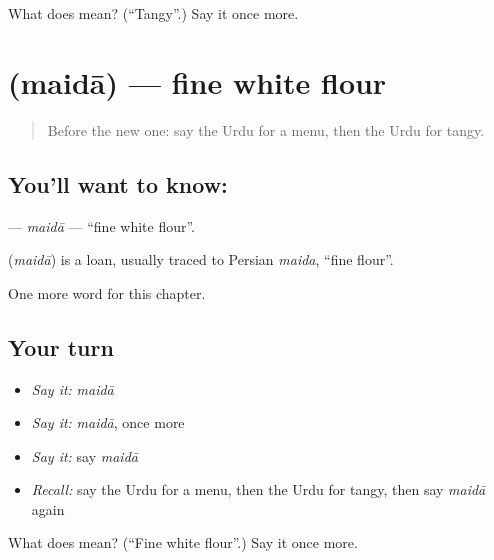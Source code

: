 \begin{tcolorbox}[breakable,colback=teal!4,colframe=teal!35!black,title={Before you move on}]
What does  mean? (\textquotedblleft{}Tangy\textquotedblright{}.) Say it once more.
\end{tcolorbox}
\section[\texorpdfstring{\ur{میدہ} (maidā)}{میدہ (maidā)}]{ (maidā) — fine white flour}

\label{lesson:UR-C259-maida}



\begin{quote}
Before the new one: say the Urdu for a menu, then the Urdu for tangy.
\end{quote}

\subsection*{You'll want to know: }
\textbf{} — \emph{maidā} — \textquotedblleft{}fine white flour\textquotedblright{}.

\begin{cousinweb}
\textbf{} (\emph{maidā}) is a loan, usually traced to Persian \emph{maida}, \textquotedblleft{}fine flour\textquotedblright{}.
\end{cousinweb}

\begin{grammarlens}[title={What you've built}]
One more word for this chapter.
\end{grammarlens}

\subsection*{Your turn}
\begin{itemize}
\raggedright
  \item \emph{Say it:} \emph{maidā}
  \item \emph{Say it:} \emph{maidā}, once more
  \item \emph{Say it:} say \emph{maidā}
  \item \emph{Recall:} say the Urdu for a menu, then the Urdu for tangy, then say \emph{maidā} again
\end{itemize}

\begin{tcolorbox}[breakable,colback=teal!4,colframe=teal!35!black,title={Before you move on}]
What does  mean? (\textquotedblleft{}Fine white flour\textquotedblright{}.) Say it once more.
\end{tcolorbox}
